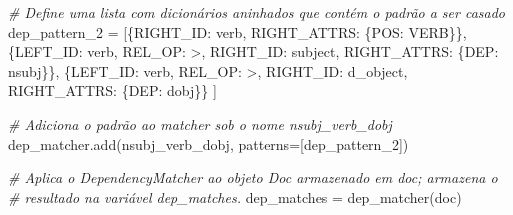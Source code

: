 \documentclass[
  brazilian,
]{article}
\newenvironment{Shaded}{}{}
\newcommand{\CommentTok}[1]{\textcolor[rgb]{0.38,0.63,0.69}{\textit{#1}}}
\newcommand{\NormalTok}[1]{#1}
\newcommand{\OperatorTok}[1]{\textcolor[rgb]{0.40,0.40,0.40}{#1}}
\newcommand{\StringTok}[1]{\textcolor[rgb]{0.25,0.44,0.63}{#1}}
\begin{document}
\begin{Shaded}
\begin{Highlighting}[]
\CommentTok{\# Define uma lista com dicionários aninhados que contém o padrão a ser casado}
\NormalTok{dep\_pattern\_2 }\OperatorTok{=}\NormalTok{ [\{}\StringTok{\textquotesingle{}RIGHT\_ID\textquotesingle{}}\NormalTok{: }\StringTok{\textquotesingle{}verb\textquotesingle{}}\NormalTok{, }\StringTok{\textquotesingle{}RIGHT\_ATTRS\textquotesingle{}}\NormalTok{: \{}\StringTok{\textquotesingle{}POS\textquotesingle{}}\NormalTok{: }\StringTok{\textquotesingle{}VERB\textquotesingle{}}\NormalTok{\}\},}
\NormalTok{                 \{}\StringTok{\textquotesingle{}LEFT\_ID\textquotesingle{}}\NormalTok{: }\StringTok{\textquotesingle{}verb\textquotesingle{}}\NormalTok{, }\StringTok{\textquotesingle{}REL\_OP\textquotesingle{}}\NormalTok{: }\StringTok{\textquotesingle{}\textgreater{}\textquotesingle{}}\NormalTok{, }\StringTok{\textquotesingle{}RIGHT\_ID\textquotesingle{}}\NormalTok{: }\StringTok{\textquotesingle{}subject\textquotesingle{}}\NormalTok{, }\StringTok{\textquotesingle{}RIGHT\_ATTRS\textquotesingle{}}\NormalTok{: \{}\StringTok{\textquotesingle{}DEP\textquotesingle{}}\NormalTok{: }\StringTok{\textquotesingle{}nsubj\textquotesingle{}}\NormalTok{\}\},}
\NormalTok{                 \{}\StringTok{\textquotesingle{}LEFT\_ID\textquotesingle{}}\NormalTok{: }\StringTok{\textquotesingle{}verb\textquotesingle{}}\NormalTok{, }\StringTok{\textquotesingle{}REL\_OP\textquotesingle{}}\NormalTok{: }\StringTok{\textquotesingle{}\textgreater{}\textquotesingle{}}\NormalTok{, }\StringTok{\textquotesingle{}RIGHT\_ID\textquotesingle{}}\NormalTok{: }\StringTok{\textquotesingle{}d\_object\textquotesingle{}}\NormalTok{, }\StringTok{\textquotesingle{}RIGHT\_ATTRS\textquotesingle{}}\NormalTok{: \{}\StringTok{\textquotesingle{}DEP\textquotesingle{}}\NormalTok{: }\StringTok{\textquotesingle{}dobj\textquotesingle{}}\NormalTok{\}\}}
\NormalTok{                ]}

\CommentTok{\# Adiciona o padrão ao matcher sob o nome \textquotesingle{}nsubj\_verb\_dobj\textquotesingle{}}
\NormalTok{dep\_matcher.add(}\StringTok{\textquotesingle{}nsubj\_verb\_dobj\textquotesingle{}}\NormalTok{, patterns}\OperatorTok{=}\NormalTok{[dep\_pattern\_2])}

\CommentTok{\# Aplica o DependencyMatcher ao objeto Doc armazenado em \textquotesingle{}doc\textquotesingle{}; armazena o}
\CommentTok{\# resultado na variável \textquotesingle{}dep\_matches\textquotesingle{}.}
\NormalTok{dep\_matches }\OperatorTok{=}\NormalTok{ dep\_matcher(doc)}


\end{Highlighting}
\end{Shaded}
\end{document}
